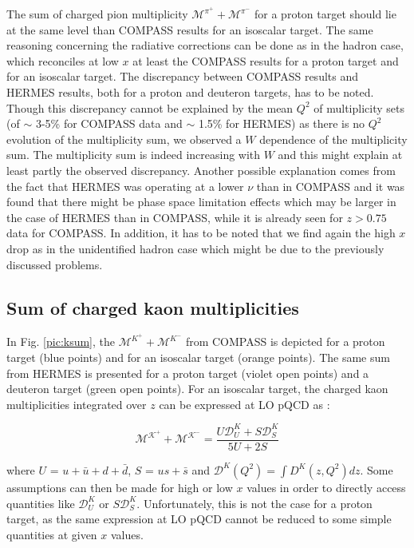 The sum of charged pion multiplicity $\mathscr{M}^{\pi^+}+\mathscr{M}^{\pi^-}$ for a proton target should lie at the same level than COMPASS results for an isoscalar target. The same reasoning concerning the radiative corrections can be done as in the hadron case, which reconciles at low $x$ at least the COMPASS results for a proton target and for an isoscalar target. The discrepancy between COMPASS results and HERMES results, both for a proton and deuteron targets, has to be noted. Though this discrepancy cannot be explained by the mean $Q^2$ of multiplicity sets (of $\sim$ 3-5\% for COMPASS data and $\sim$ 1.5\% for HERMES) as there is no $Q^2$ evolution of the multiplicity sum, we observed a $W$ dependence of the multiplicity sum. The multiplicity sum is indeed increasing with $W$ and this might explain at least partly the observed discrepancy. Another possible explanation comes from the fact that HERMES was operating at a lower $\nu$ than in COMPASS and it was found that there might be phase space limitation effects which may be larger in the case of HERMES than in COMPASS, while it is already seen for $z>0.75$ data for COMPASS\cite{MarcinPubli}. In addition, it has to be noted that we find again the high $x$ drop as in the unidentified hadron case which might be due to the previously discussed problems.

\subsection{Sum of charged kaon multiplicities}

In Fig. \ref{pic:ksum}, the $\mathscr{M}^{K^+}+\mathscr{M}^{K^-}$ from COMPASS is depicted for a proton target (blue points) and for an isoscalar target (orange points). The same sum from HERMES is presented for a proton target (violet open points) and a deuteron target (green open points). For an isoscalar target, the charged kaon multiplicities integrated over $z$ can be expressed at LO pQCD as :

\begin{equation}
  \mathscr{M^{K^+}}+\mathscr{M^{K^-}} = \frac{U\mathscr{D}^K_U+S\mathscr{D}^K_S}{5U+2S}
\end{equation}

where $U$ = $u+\bar{u}+d+\bar{d}$, $S$ = $us+\bar{s}$ and $\mathscr{D}^K(Q^2) = \int D^K(z,Q^2) dz $. Some assumptions can then be made for high or low $x$ values in order to directly access quantities like $\mathscr{D}^K_U$ or $S\mathscr{D}^K_S$. Unfortunately, this is not the case for a proton target, as the same expression at LO pQCD cannot be reduced to some simple quantities at given $x$ values.

